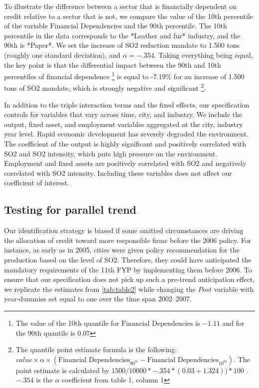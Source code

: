 \documentclass[12pt]{article}
\begin{document}
To illustrate the difference between a sector that is financially dependent on credit relative to a sector that is not, we compare the value of the 10th percentile of the variable $\text{Financial Dependencies}$ and the 90th percentile. The 10th percentile in the data corresponds to the *Leather and fur* industry, and the 90th is *Paper*. We set the increase of SO2 reduction mandate to 1.500 tons (roughly one standard deviation), and $\alpha= -.354$. Taking everything being equal, the key point is that the differential impact between the 90th and 10th percentiles of financial dependence \footnote{The value of the 10th quantile for  $\text{Financial Dependencies}$ is $-1.11$ and for the 90th quantile is 0.07} is equal to -7.19\% for an increase of 1.500 tons of SO2 mandate, which is strongly negative and significant \footnote{The quantile point estimate formula is the following: $value \times \alpha \times (\text{Financial Dependencies}_{90^{th}} - \text{Financial Dependencies}_{10^{th}})$. The point estimate is calculated by $1500/10000 * -.354 * (0.03 + 1.324 )) * 100$ . $-.354$ is the $\alpha$ coefficient from table 1, column 1}.

In addition to the triple interaction terms and the fixed effects, our specification controls for variables that vary across time, city, and industry. We include the output, fixed asset, and employment variables aggregated at the city, industry year level. Rapid economic development has severely degraded the environment. The coefficient of the output is highly significant and positively correlated with SO2 and SO2 intensity, which puts high pressure on the environment. Employment and fixed assets are positively correlated with SO2 and negatively correlated with SO2 intensity. Including these variables does not affect our coefficient of interest.

\subsection{Testing for parallel trend}

Our identification strategy is biased if some omitted circumstances are driving the allocation of credit toward more responsible firms before the 2006 policy. For instance, as early as in 2005, cities were given policy recommendation for the production based on the level of SO2. Therefore, they could have anticipated the mandatory requirements of the 11th FYP by implementing them before 2006. To ensure that our specification does not pick up such a pre-trend anticipation effect, we replicate the estimates from \ref{tab:table2} while changing the $Post$ variable with year-dummies set equal to one over the time span 2002–2007.
\end{document}
